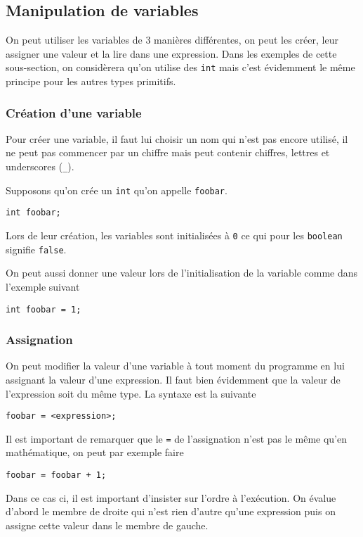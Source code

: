 \subsection{Manipulation de variables}
On peut utiliser les variables de 3 manières différentes, on peut les créer,
leur assigner une valeur et la lire dans une expression.
Dans les exemples de cette sous-section, on considèrera qu'on utilise des
\lstinline|int| mais c'est évidemment le même principe pour les autres types
primitifs.

\subsubsection{Création d'une variable}
Pour créer une variable, il faut lui choisir un nom qui n'est pas encore
utilisé, il ne peut pas commencer par un chiffre mais peut contenir chiffres,
lettres et underscores (\lstinline|_|).

Supposons qu'on crée un \lstinline|int| qu'on appelle \lstinline|foobar|.
\begin{lstlisting}
int foobar;
\end{lstlisting}
Lors de leur création,
les variables sont initialisées à \lstinline|0| ce qui pour
les \lstinline|boolean| signifie \lstinline|false|.

On peut aussi donner une valeur lors de l'initialisation de la variable
comme dans l'exemple suivant
\begin{lstlisting}
int foobar = 1;
\end{lstlisting}

\subsubsection{Assignation}
On peut modifier la valeur d'une variable à tout moment du programme en lui
assignant la valeur d'une expression. Il faut bien évidemment que la valeur
de l'expression soit du même type. La syntaxe est la suivante
\begin{lstlisting}
foobar = <expression>;
\end{lstlisting}

Il est important de remarquer que le \lstinline|=| de l'assignation n'est pas le
même qu'en mathématique, on peut par exemple faire
\begin{lstlisting}
foobar = foobar + 1;
\end{lstlisting}

Dans ce cas ci, il est important d'insister sur l'ordre à l'exécution.
On évalue d'abord le membre de droite qui n'est rien d'autre qu'une expression
puis on assigne cette valeur dans le membre de gauche.

